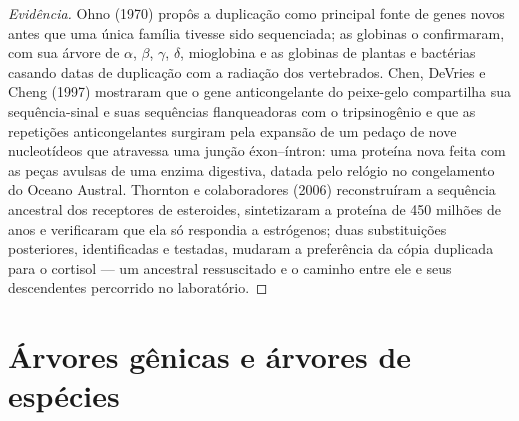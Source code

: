 \begin{proof}[Evidência]
Ohno (1970) propôs a duplicação como principal fonte de genes novos antes
que uma única família tivesse sido sequenciada; as globinas o
confirmaram, com sua árvore de $\alpha$, $\beta$, $\gamma$, $\delta$,
mioglobina e as globinas de plantas e bactérias casando datas de
duplicação com a radiação dos vertebrados. Chen, DeVries e Cheng (1997)
mostraram que o gene anticongelante do peixe-gelo compartilha sua
sequência-sinal e suas sequências flanqueadoras com o tripsinogênio e que
as repetições anticongelantes surgiram pela expansão de um pedaço de nove
nucleotídeos que atravessa uma junção éxon--íntron: uma proteína nova
feita com as peças avulsas de uma enzima digestiva, datada pelo relógio
no congelamento do Oceano Austral. Thornton e colaboradores (2006)
reconstruíram a sequência ancestral dos receptores de esteroides,
sintetizaram a proteína de 450 milhões de anos e verificaram que ela só
respondia a estrógenos; duas substituições posteriores, identificadas e
testadas, mudaram a preferência da cópia duplicada para o cortisol --- um
ancestral ressuscitado e o caminho entre ele e seus descendentes
percorrido no laboratório.
\end{proof}

\section{Árvores gênicas e árvores de espécies}

